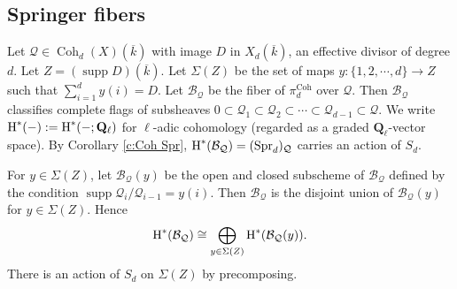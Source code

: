 \documentclass[reqno]{amsart}
\numberwithin{equation}{section}
\newcommand{\Q}{\mathbf{Q}}
\DeclareMathOperator{\Coh}{Coh}
\DeclareMathOperator{\supp}{supp}
\DeclareMathOperator{\Spr}{Spr}
\newcommand{\ov}{\overline}
\newcommand{\cohog}[2]{\textup{H}^{#1}({#2})}     %
\newcommand\cB{\mathcal{B}}
\newcommand\cQ{\mathcal{Q}}
\theoremstyle{remark}
\numberwithin{equation}{section}
\begin{document}
\subsection{Springer fibers}\label{ss:Spr fiber}
Let $\cQ\in \Coh_{d}(X)(\ov k)$ with image $D$ in $X_{d}(\ov k)$, an effective divisor of degree $d$.  Let $Z=(\supp D)(\ov k)$. Let $\Sigma(Z)$ be the set of maps $y:\{1,2,\cdots, d\}\to Z$ such that $\sum_{i=1}^{d}y(i)=D$. Let $\cB_{\cQ}$  be the fiber of $\pi^{\Coh}_{d}$ over $\cQ$. Then $\cB_{\cQ}$ classifies complete flags of subsheaves $0\subset \cQ_{1}\subset \cQ_{2}\subset\cdots\subset \cQ_{d-1}\subset \cQ$. We write $\cohog{*}{-} := \cohog{*}{-; \Q_\ell}$ for $\ell$-adic cohomology (regarded as a graded $\Q_{\ell}$-vector space). By Corollary \ref{c:Coh Spr}, $\cohog{*}{\cB_{\cQ}}=(\Spr_{d})_{\cQ}$ carries an action of $S_{d}$.

For $y\in \Sigma(Z)$, let $\cB_{\cQ}(y)$ be the open and closed subscheme of $\cB_{\cQ}$ defined by the condition $\supp\cQ_{i}/\cQ_{i-1}=y(i)$. Then $\cB_{\cQ}$ is the disjoint union of $\cB_{\cQ}(y)$ for $y\in \Sigma(Z)$. Hence
\begin{equation*}
\cohog{*}{\cB_{\cQ}}\cong \bigoplus_{y\in \Sigma(Z)}\cohog{*}{\cB_{\cQ}(y)}.
\end{equation*}
There is an action of $S_{d}$ on $\Sigma(Z)$ by precomposing. 
\end{document}
